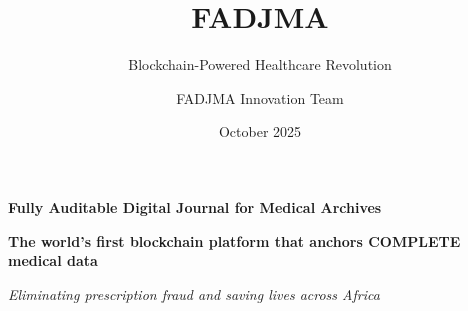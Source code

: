 \documentclass[aspectratio=169,xcolor=dvipsnames,20pt]{beamer}
\title[FADJMA]{FADJMA}
\subtitle{Blockchain-Powered Healthcare Revolution}
\author[Cheikh Modiouf]{FADJMA Innovation Team}
\institute[Hedera Hack Africa]{Hedera Africa Hackathon 2025 \\ Healthcare Operations Track}
\date{October 2025}
\begin{document}
\begin{frame}
  \titlepage

  \begin{center}
    \Large{\textbf{Fully Auditable Digital Journal for Medical Archives}}

    \vspace{0.5cm}

    \large{\textcolor{HederaPurple}{\textbf{The world's first blockchain platform that anchors COMPLETE medical data}}}

    \vspace{0.3cm}

    \textit{Eliminating prescription fraud and saving lives across Africa}

    \vspace{0.5cm}

  \end{center}
\end{frame}
\end{document}
